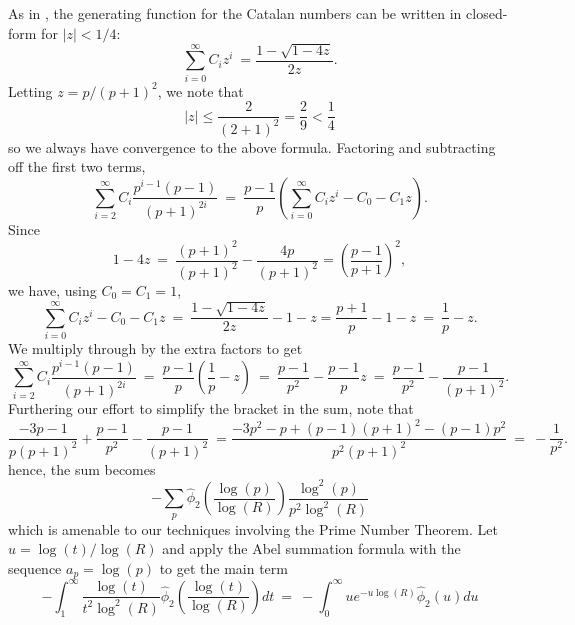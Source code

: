 \documentclass[11pt, reqno]{amsart}
\makeatletter
\renewenvironment{proof}[1][\proofname]{\par
  \vspace{-.7\topsep}%
  \pushQED{\qed}%
  \normalfont
  \topsep0pt \partopsep0pt %
  \trivlist
  \item[\hskip\labelsep
        \itshape
    #1\@addpunct{.}]\ignorespaces
}{%
  \popQED\endtrivlist\@endpefalse
  \addvspace{6pt plus 6pt} %
}
\theoremstyle{definition}
\theoremstyle{remark}
\numberwithin{equation}{section}
\renewcommand{\hat}{\widehat}
\makeatother
\begin{document}
\begin{proof}
As in \cite{Sl}, the generating function for the Catalan numbers can be written in closed-form for $|z|<1/4$:
\begin{equation}\label{catSum}
    \sum_{i=0}^\infty C_i z^i \ = \frac{1-\sqrt{1-4z}}{2z}.
\end{equation}
Letting $z=p/(p+1)^2$, we note that
\begin{equation}
    |z|\leq \frac{2}{(2+1)^2}=\frac{2}{9}<\frac{1}{4}
\end{equation}
so we always have convergence to the above formula. Factoring and subtracting off the first two terms,
\begin{equation}
\sum_{i=2}^\infty C_i\frac{p^{i-1}(p-1)}{(p+1)^{2i}} \ = \ \frac{p-1}{p}\left(\sum_{i=0}^\infty C_iz^i-C_0-C_1z\right).
\end{equation}
Since 
\begin{equation}
1-4z \ = \ \frac{(p+1)^2}{(p+1)^2}-\frac{4p}{(p+1)^2}=\left(\frac{p-1}{p+1}\right)^2,
\end{equation}
we have, using $C_0=C_1=1$,
\begin{equation}
\sum_{i=0}^\infty C_i z^i-C_0-C_1z \ = \ \frac{1-\sqrt{1-4z}}{2z}-1-z=\frac{p+1}{p}-1-z \ = \ \frac{1}{p}-z.
\end{equation}
We multiply through by the extra factors to get
\begin{equation}
\sum_{i=2}^\infty C_i \frac{p^{i-1}(p-1)}{(p+1)^{2i}} \ = \ \frac{p-1}{p}\left(\frac{1}{p}-z\right) \ = \ \frac{p-1}{p^2}-\frac{p-1}{p}z \ = \ \frac{p-1}{p^2}-\frac{p-1}{(p+1)^2}.
\end{equation}
Furthering our effort to simplify the bracket in the sum, note that
\begin{equation}
\frac{-3p-1}{p(p+1)^2}+\frac{p-1}{p^2}-\frac{p-1}{(p+1)^2}\ = \frac{-3p^2-p+(p-1)(p+1)^2-(p-1)p^2}{p^2(p+1)^2}\ = \ -\frac{1}{p^2}.
\end{equation}
hence, the sum becomes
\begin{equation}
-\sum_p\hat\phi_2\left(\frac{\log(p)}{\log(R)}\right) \frac{\log^2(p)}{p^2\log ^2 (R)}
\end{equation}
which is amenable to our techniques involving the Prime Number Theorem. Let $u=\log(t)/\log(R)$ and apply the Abel summation formula with the sequence $a_p=\log(p)$ to get the main term
\begin{equation}
    -\int_1^\infty \frac{\log(t)}{t^2\log^2(R)}\hat\phi_2\left(\frac{\log(t) }{\log(R)}\right)dt \ = \ -\int_0^\infty u e^{-u\log(R)} \hat\phi_2(u)du

\end{equation}
\end{proof}
\end{document}
